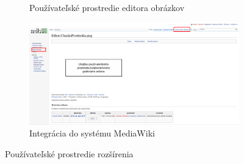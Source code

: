 \begin{figure}
\begin{subfigure}[t]{1\linewidth}
		\caption{Používateľské prostredie editora obrázkov}
	\end{subfigure}
	\quad
	\begin{subfigure}[t]{1\linewidth}	
		\centerline{\includegraphics[width=1\textwidth]{images/results/base-integration}}
		\caption{Integrácia do systému MediaWiki}
	\end{subfigure}
	\caption{Používateľské prostredie rozšírenia}
\end{figure}


